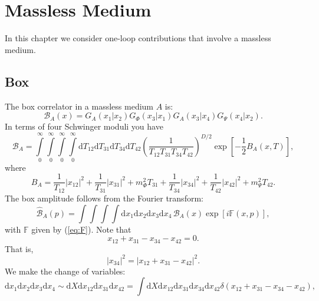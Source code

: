 \chapter{Massless Medium}
In this chapter we consider one-loop contributions that involve a massless medium.
\section{Box}
The box correlator in a massless medium $A$ is:
\begin{equation}
	\mathcal{B}_{A}(x) = G_{A}(x_{1}| x_{2}) G_{\Phi}(x_{3}| x_{1}) G_{A}(x_{3}| x_{4}) G_{\Psi}(x_{4}| x_{2}).
	\label{eq:box_A}
\end{equation}
In terms of four Schwinger moduli you have
\begin{equation}
	\mathcal{B}_{A} = \int\limits_{0}^{\infty} \int\limits_{0}^{\infty} \int\limits_{0}^{\infty} \int\limits_{0}^{\infty} \mathrm{d}T_{12} \mathrm{d}T_{31} \mathrm{d}T_{34} \mathrm{d}T_{42} \left( \frac{1}{T_{12} T_{31} T_{34} T_{42}} \right)^{D/2} \exp{\left[- \frac{1}{2} B_{A}(x, T) \right]},
\end{equation}
where
\begin{equation}
	B_{A} = \frac{1}{T_{12}} |x_{12}|^{2} + \frac{1}{T_{31}} |x_{31}|^{2} + m_{\Phi}^{2} T_{31} + \frac{1}{T_{34}} |x_{34}|^{2} + \frac{1}{T_{42}} |x_{42}|^{2} + m_{\Psi}^{2} T_{42}.
\end{equation}
The box amplitude follows from the Fourier transform:
\begin{equation}
	\widehat{\mathcal{B}}_{A}(p) = \int \int \int \int \mathrm{d}x_{1} \mathrm{d}x_{2} \mathrm{d}x_{3} \mathrm{d}x_{4} \, \mathcal{B}_{A}(x) \exp{\left[ i \mathbb{F}(x, p) \right]},
\end{equation}
with $\mathbb{F}$ given by (\ref{eq:F}). Note that
\begin{equation}
	 x_{12} + x_{31} - x_{34} - x_{42} = 0.
\end{equation}
That is,
\begin{equation}
	|x_{34}|^{2} = |x_{12} + x_{31} - x_{42}|^{2}.
\end{equation}
We make the change of variables:
\begin{equation}
	\mathrm{d}x_{1} \mathrm{d}x_{2} \mathrm{d}x_{3} \mathrm{d}x_{4} \sim \mathrm{d}X \mathrm{d}x_{12} \mathrm{d}x_{31} \mathrm{d}x_{42} = \int \mathrm{d}X \mathrm{d}x_{12} \mathrm{d}x_{31} \mathrm{d}x_{34} \mathrm{d}x_{42} \delta(x_{12} + x_{31} - x_{34} - x_{42}),
\end{equation}

